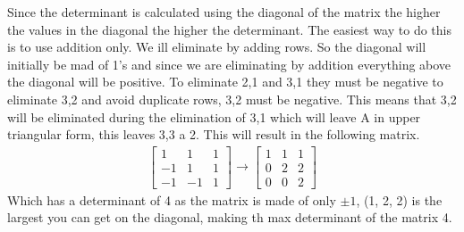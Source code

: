 \documentclass[]{exam}
\begin{document}
\begin{questions}
		\begin{solution}
			Since the determinant is calculated using the diagonal of the matrix the higher the values in the diagonal the higher the determinant. The easiest way to do this is to use addition only.  We ill eliminate by adding rows.  So the diagonal will initially be mad of 1's and since we are eliminating by addition everything above the diagonal will be positive. To eliminate 2,1 and 3,1 they must be negative to eliminate 3,2 and avoid duplicate rows, 3,2 must be negative. This means that 3,2 will be eliminated during the elimination of 3,1 which will leave A in upper triangular form, this leaves 3,3 a 2. This will result in the following matrix.
			\begin{gather*}
			    \begin{bmatrix}
			        1 & 1 & 1 \\
			        -1 & 1 & 1 \\
			        -1 & -1 & 1
			    \end{bmatrix}\xrightarrow{}\begin{bmatrix}
			        1 & 1 & 1 \\
			        0 & 2 & 2  \\
			        0 & 0 & 2
			    \end{bmatrix}
			\end{gather*}
			Which has a determinant of 4 as the matrix is made of only $\pm1$, (1, 2, 2) is the largest you can get on the diagonal, making th max determinant of the matrix 4.
		\end{solution}
		
\end{questions}
\end{document}
